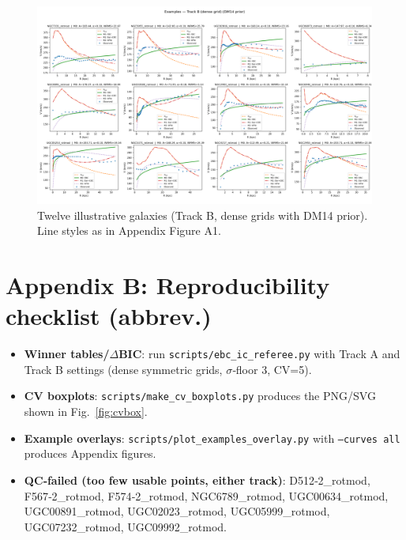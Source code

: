 \documentclass[12pt]{article}
\begin{document}
\begin{figure}[H]
  \centering
  \includegraphics[width=\linewidth]{figs_m0_examples/trackB_dense_all/galaxy_parade_all.png}
  \caption{Twelve illustrative galaxies (Track B, dense grids with DM14 prior). Line styles as in Appendix Figure A1.}
\end{figure}

\section*{Appendix B: Reproducibility checklist (abbrev.)}
\begin{itemize}\itemsep0.2em
\item \textbf{Winner tables/$\Delta$BIC}: run \texttt{scripts/ebc\_ic\_referee.py} with Track A and Track B settings (dense symmetric grids, $\sigma$‑floor \SI{3}{\kms}, CV=5).
\item \textbf{CV boxplots}: \texttt{scripts/make\_cv\_boxplots.py} produces the PNG/SVG shown in Fig.~\ref{fig:cvbox}.
\item \textbf{Example overlays}: \texttt{scripts/plot\_examples\_overlay.py} with \texttt{--curves all} produces Appendix figures.
\item \textbf{QC‑failed (too few usable points, either track)}: D512‑2\_rotmod, F567‑2\_rotmod, F574‑2\_rotmod, NGC6789\_rotmod, UGC00634\_rotmod, UGC00891\_rotmod, UGC02023\_rotmod, UGC05999\_rotmod, UGC07232\_rotmod, UGC09992\_rotmod.
\end{itemize}
\end{document}
